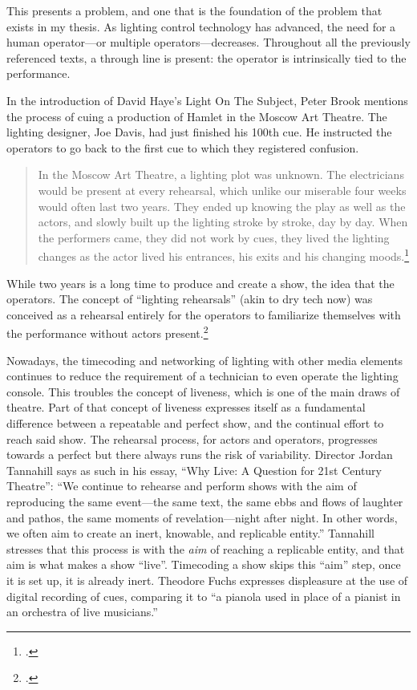 \documentclass[
    12pt,
    twoside,
    bibstyle=chicago,
    headerstyle=uppercase,
	bibfile=biblatex_updating.bib
]{reedthesis}
\begin{document}
This presents a problem, and one that is the foundation of the problem that exists in my thesis. As lighting control technology has advanced, the need for a human operator---or multiple operators---decreases. Throughout all the previously referenced texts, a through line is present: the operator is intrinsically tied to the performance.

In the introduction of David Haye's Light On The Subject, Peter Brook mentions the process of cuing a production of Hamlet in the Moscow Art Theatre. The lighting designer, Joe Davis, had just finished his 100th cue. He instructed the operators to go back to the first cue to which they registered confusion.

\begin{quote}
In the Moscow Art Theatre, a lighting plot was unknown. The electricians would be present at every rehearsal, which unlike our miserable four weeks would often last two years. They ended up knowing the play as well as the actors, and slowly built up the lighting stroke by stroke, day by day. When the performers came, they did not work by cues, they lived the lighting changes as the actor lived his entrances, his exits and his changing moods.\footcite[p. 1]{haysLightSubjectStage1989}
\end{quote}

While two years is a long time to produce and create a show, the idea that the operators. The concept of “lighting rehearsals” (akin to dry tech now) was conceived as a rehearsal entirely for the operators to familiarize themselves with the performance without actors present.\footcite[p. 252]{benthamStageLighting1980}

Nowadays, the timecoding and networking of lighting with other media elements continues to reduce the requirement of a technician to even operate the lighting console. This troubles the concept of liveness, which is one of the main draws of theatre. Part of that concept of liveness expresses itself as a fundamental difference between a repeatable and perfect show, and the continual effort to reach said show. The rehearsal process, for actors and operators, progresses towards a perfect but there always runs the risk of variability. Director Jordan Tannahill says as such in his essay, “Why Live: A Question for 21st Century Theatre”: “We continue to rehearse and perform shows with the aim of reproducing the same event---the same text, the same ebbs and flows of laughter and pathos, the same moments of revelation---night after night. In other words, we often aim to create an inert, knowable, and replicable entity.” %
Tannahill stresses that this process is with the \textit{aim} of reaching a replicable entity, and that aim is what makes a show ``live''. Timecoding a show skips this ``aim'' step, once it is set up, it is already inert. Theodore Fuchs expresses displeasure at the use of digital recording of cues, comparing it to “a pianola used in place of a pianist in an orchestra of live musicians.” 
\end{document}
